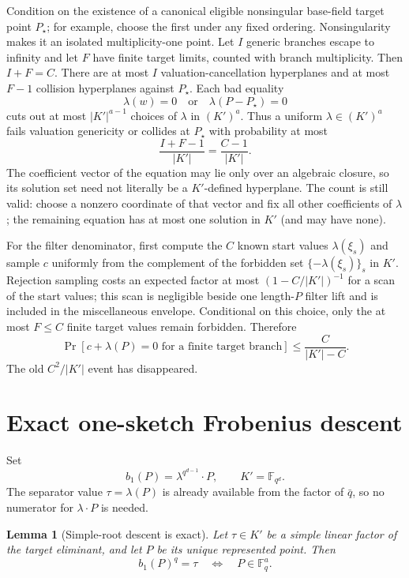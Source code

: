 \documentclass[11pt]{article}
\newtheorem{lemma}[theorem]{Lemma}
\theoremstyle{definition}
\newcommand{\F}{\mathbb F}
\begin{document}
Condition on the existence of a canonical eligible nonsingular base-field target point $P_\star$; for example, choose the first under any fixed ordering.  Nonsingularity makes it an isolated multiplicity-one point.  Let $I$ generic branches escape to infinity and let $F$ have finite target limits, counted with branch multiplicity.  Then $I+F=C$.  There are at most $I$ valuation-cancellation hyperplanes and at most $F-1$ collision hyperplanes against $P_\star$.  Each bad equality
\[
 \lambda(w)=0
 \quad\text{or}\quad
 \lambda(P-P_\star)=0
\]
cuts out at most $|K'|^{a-1}$ choices of $\lambda$ in $(K')^a$.  Thus a uniform $\lambda\in(K')^a$ fails valuation genericity or collides at $P_\star$ with probability at most
\begin{equation}\label{eq:lambdafail}
 \frac{I+F-1}{|K'|}=\frac{C-1}{|K'|}.
\end{equation}
The coefficient vector of the equation may lie only over an algebraic closure, so its solution set need not literally be a $K'$-defined hyperplane.  The count is still valid: choose a nonzero coordinate of that vector and fix all other coefficients of $\lambda$; the remaining equation has at most one solution in $K'$ (and may have none).

For the filter denominator, first compute the $C$ known start values $\lambda(\xi_s)$ and sample $c$ uniformly from the complement of the forbidden set $\{-\lambda(\xi_s)\}_s$ in $K'$.  Rejection sampling costs an expected factor at most $(1-C/|K'|)^{-1}$ for a scan of the start values; this scan is negligible beside one length-$P$ filter lift and is included in the miscellaneous envelope.  Conditional on this choice, only the at most $F\le C$ finite target values remain forbidden.  Therefore
\begin{equation}\label{eq:cfail}
 \Pr[c+\lambda(P)=0\text{ for a finite target branch}]
 \le \frac{C}{|K'|-C}.
\end{equation}
The old $C^2/|K'|$ event has disappeared.

\section{Exact one-sketch Frobenius descent}\label{sec:frob}

Set
\[
 b_1(P)=\lambda^{q^{d-1}}\!\cdot P,
 \qquad K'=\F_{q^d}.
\]
The separator value $\tau=\lambda(P)$ is already available from the factor of $\bar q$, so no numerator for $\lambda\cdot P$ is needed.

\begin{lemma}[Simple-root descent is exact]\label{lem:exactfrob}
Let $\tau\in K'$ be a simple linear factor of the target eliminant, and let $P$ be its unique represented point.  Then
\[
 b_1(P)^q=\tau
 \quad\Longleftrightarrow\quad
 P\in\F_q^a.
\]
\end{lemma}
\end{document}
